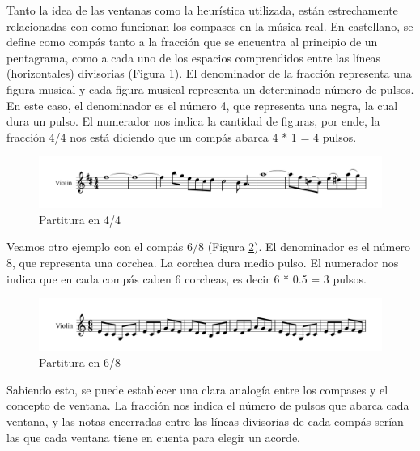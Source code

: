     Tanto la idea de las ventanas como la heurística utilizada, están estrechamente relacionadas con como funcionan los compases en la música real. En castellano, se define como compás tanto a la fracción que se encuentra al principio de un pentagrama, como a cada uno de los espacios comprendidos entre las líneas (horizontales) divisorias (Figura \ref{fig:sheet4/4}). El denominador de la fracción representa una figura musical y cada figura musical representa un determinado número de pulsos. En este caso, el denominador es el número 4, que representa una negra, la cual dura un pulso. El numerador nos indica la cantidad de figuras, por ende, la fracción 4/4 nos está diciendo que un compás abarca 4 * 1 = 4 pulsos. 

\begin{figure}[h]
    \begin{center}
        \includegraphics[scale=0.65]{Imagenes/Bitmap/partitura.png}
    \end{center}
    \caption{Partitura en 4/4}
    \label{fig:sheet4/4}
\end{figure}

    Veamos otro ejemplo con el compás 6/8 (Figura \ref{fig:sheet6/8}). El denominador es el número 8, que representa una corchea. La corchea dura medio pulso. El numerador nos indica que en cada compás caben 6 corcheas, es decir 6 * 0.5 = 3 pulsos.

\begin{figure}[h]
    \begin{center}
        \includegraphics[scale=0.65]{Imagenes/Bitmap/partitura2.png}
    \end{center}
    \caption{Partitura en 6/8}
    \label{fig:sheet6/8}
\end{figure}

    Sabiendo esto, se puede establecer una clara analogía entre los compases y el concepto de ventana. La fracción nos indica el número de pulsos que abarca cada ventana, y las notas encerradas entre las líneas divisorias de cada compás serían las que cada ventana tiene en cuenta para elegir un acorde. 

